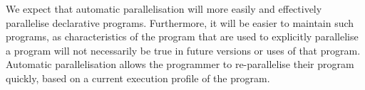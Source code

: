 

We expect that automatic parallelisation will more easily and
effectively parallelise declarative programs.
Furthermore, it will be easier to maintain such programs, as
characteristics of the program that are used to explicitly parallelise
a program will not necessarily be true in future versions or uses of that
program.
Automatic parallelisation allows the programmer to re-parallelise
their program quickly, based on a current execution profile of the
program.

